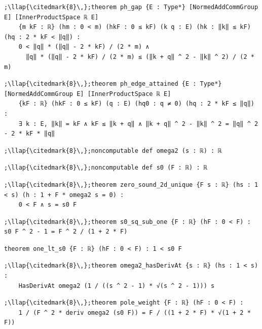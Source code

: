 \begin{lstlisting}[style=leancat]
;\llap{\citedmark{8}\,};theorem ph_gap {E : Type*} [NormedAddCommGroup E] [InnerProductSpace ℝ E]
    {m kF : ℝ} (hm : 0 < m) (hkF : 0 ≤ kF) (k q : E) (hk : ‖k‖ ≤ kF) (hq : 2 * kF < ‖q‖) :
    0 < ‖q‖ * (‖q‖ - 2 * kF) / (2 * m) ∧
      ‖q‖ * (‖q‖ - 2 * kF) / (2 * m) ≤ (‖k + q‖ ^ 2 - ‖k‖ ^ 2) / (2 * m)
\end{lstlisting}

\begin{lstlisting}[style=leancat]
;\llap{\citedmark{8}\,};theorem ph_edge_attained {E : Type*} [NormedAddCommGroup E] [InnerProductSpace ℝ E]
    {kF : ℝ} (hkF : 0 ≤ kF) (q : E) (hq0 : q ≠ 0) (hq : 2 * kF ≤ ‖q‖) :
    ∃ k : E, ‖k‖ = kF ∧ kF ≤ ‖k + q‖ ∧ ‖k + q‖ ^ 2 - ‖k‖ ^ 2 = ‖q‖ ^ 2 - 2 * kF * ‖q‖
\end{lstlisting}

\begin{lstlisting}[style=leancat]
;\llap{\citedmark{8}\,};noncomputable def omega2 (s : ℝ) : ℝ
\end{lstlisting}

\begin{lstlisting}[style=leancat]
;\llap{\citedmark{8}\,};noncomputable def s0 (F : ℝ) : ℝ
\end{lstlisting}

\begin{lstlisting}[style=leancat]
;\llap{\citedmark{8}\,};theorem zero_sound_2d_unique {F s : ℝ} (hs : 1 < s) (h : 1 + F * omega2 s = 0) :
    0 < F ∧ s = s0 F
\end{lstlisting}

\begin{lstlisting}[style=leancat]
;\llap{\citedmark{8}\,};theorem s0_sq_sub_one {F : ℝ} (hF : 0 < F) : s0 F ^ 2 - 1 = F ^ 2 / (1 + 2 * F)
\end{lstlisting}

\begin{lstlisting}[style=leancat]
theorem one_lt_s0 {F : ℝ} (hF : 0 < F) : 1 < s0 F
\end{lstlisting}

\begin{lstlisting}[style=leancat]
;\llap{\citedmark{8}\,};theorem omega2_hasDerivAt {s : ℝ} (hs : 1 < s) :
    HasDerivAt omega2 (1 / ((s ^ 2 - 1) * √(s ^ 2 - 1))) s
\end{lstlisting}

\begin{lstlisting}[style=leancat]
;\llap{\citedmark{8}\,};theorem pole_weight {F : ℝ} (hF : 0 < F) :
    1 / (F ^ 2 * deriv omega2 (s0 F)) = F / ((1 + 2 * F) * √(1 + 2 * F))
\end{lstlisting}

